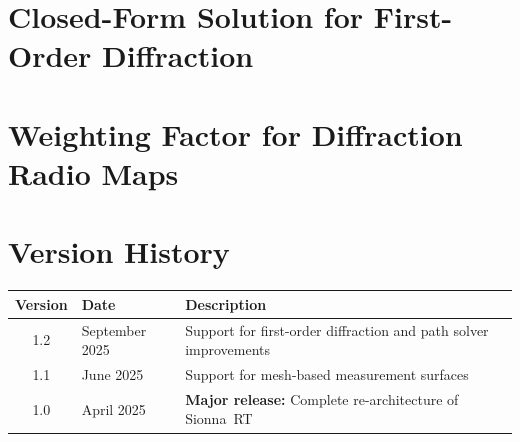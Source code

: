 \documentclass[10pt,logo]{nvidiatechreport}
\begin{document}
\section{Closed-Form Solution for First-Order Diffraction}
\label{sec:diffraction-first-order}


\section{Weighting Factor for Diffraction Radio Maps}
\label{sec:diffraction-radio-map-weighting-factor}


\newpage


\section*{Version History}

\renewcommand{\arraystretch}{1.4}
\begin{tabular}{cll}
\hline
\textbf{Version} & \textbf{Date} & \textbf{Description} \\
\hline
1.2 & September 2025 & Support for first-order diffraction and path solver improvements \\
1.1 & June 2025 & Support for mesh-based measurement surfaces \\
1.0 & April 2025 & \textbf{Major release:} Complete re-architecture of Sionna~RT \\
\hline
\end{tabular}
\renewcommand{\arraystretch}{1.0}

\newpage



\end{document}
